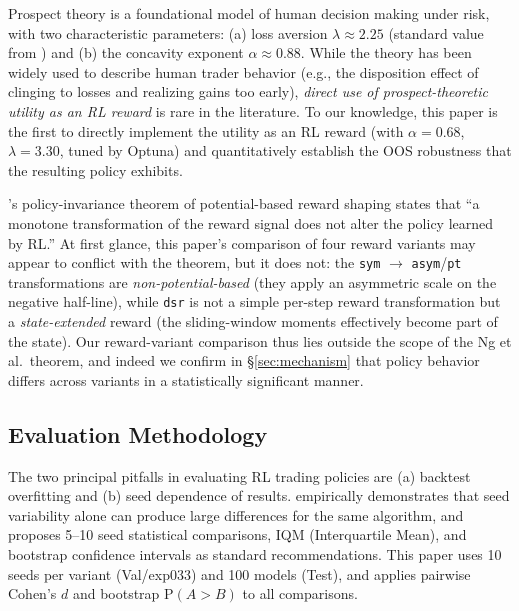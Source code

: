 \documentclass[11pt, a4paper]{article}
\begin{document}
Prospect theory \citep{kahneman1979prospect} is a foundational model of
human decision making under risk, with two characteristic parameters:
(a) loss aversion $\lambda \approx 2.25$ (standard value from
\citealt{tversky1992cumulative}) and (b) the concavity exponent
$\alpha \approx 0.88$. While the theory has been widely used to describe
human trader behavior (e.g., the disposition effect of clinging to losses and
realizing gains too early), \emph{direct use of prospect-theoretic utility as
an RL reward} is rare in the literature. To our knowledge, this paper is the
first to directly implement the \citet{kahneman1979prospect} utility as an RL
reward (with $\alpha=0.68$, $\lambda=3.30$, tuned by Optuna) and quantitatively
establish the OOS robustness that the resulting policy exhibits.

\citet{ng1999reward}'s policy-invariance theorem of potential-based reward
shaping states that ``a monotone transformation of the reward signal does not
alter the policy learned by RL.'' At first glance, this paper's comparison of
four reward variants may appear to conflict with the theorem, but it does not:
the \texttt{sym} $\to$ \texttt{asym}/\texttt{pt} transformations are
\emph{non-potential-based} (they apply an asymmetric scale on the negative
half-line), while \texttt{dsr} is not a simple per-step reward transformation
but a \emph{state-extended} reward (the sliding-window moments effectively
become part of the state). Our reward-variant comparison thus lies outside the
scope of the Ng et al.\ theorem, and indeed we confirm in
\S\ref{sec:mechanism} that policy behavior differs across variants in a
statistically significant manner.

\subsection{Evaluation Methodology}
\label{sec:related_eval}

The two principal pitfalls in evaluating RL trading policies are (a) backtest
overfitting and (b) seed dependence of results.
\citet{henderson2018rlreproducibility} empirically demonstrates that seed
variability alone can produce large differences for the same algorithm, and
proposes 5--10 seed statistical comparisons, IQM (Interquartile Mean), and
bootstrap confidence intervals as standard recommendations. This paper uses
10 seeds per variant (Val/exp033) and 100 models (Test), and applies pairwise
Cohen's $d$ and bootstrap $\mathrm{P}(A>B)$ to all comparisons.
\end{document}
